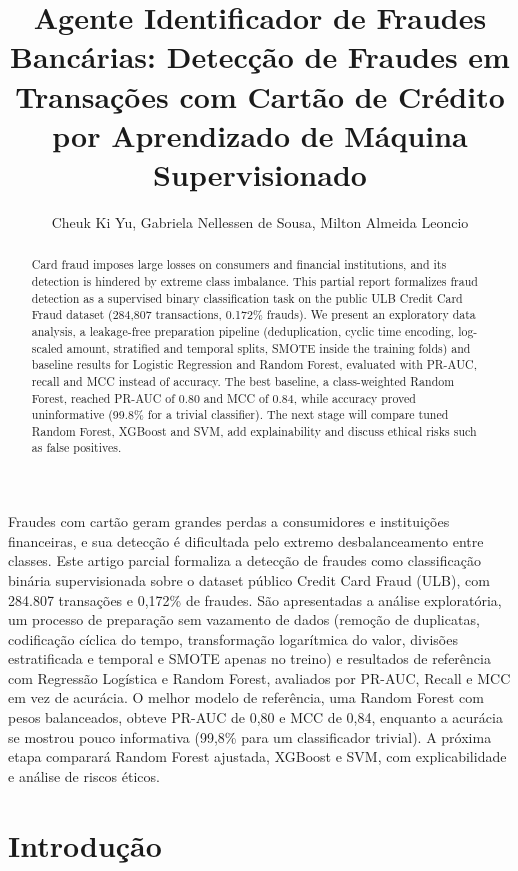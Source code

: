 \documentclass[12pt]{article}
\title{Agente Identificador de Fraudes Bancárias: Detecção de Fraudes em
Transações com Cartão de Crédito por Aprendizado de Máquina Supervisionado}
\author{Cheuk Ki Yu\inst{1}, Gabriela Nellessen de Sousa\inst{1}, Milton Almeida Leoncio\inst{1}}
\begin{document}
\maketitle

\begin{abstract}
Card fraud imposes large losses on consumers and financial institutions, and
its detection is hindered by extreme class imbalance. This partial report
formalizes fraud detection as a supervised binary classification task on the
public ULB Credit Card Fraud dataset (284,807 transactions, 0.172\% frauds).
We present an exploratory data analysis, a leakage-free preparation pipeline
(deduplication, cyclic time encoding, log-scaled amount, stratified and
temporal splits, SMOTE inside the training folds) and baseline results for
Logistic Regression and Random Forest, evaluated with PR-AUC, recall and MCC
instead of accuracy. The best baseline, a class-weighted Random Forest, reached PR-AUC of 0.80 and MCC of 0.84, while accuracy proved uninformative (99.8\% for a trivial classifier). The next
stage will compare tuned Random Forest, XGBoost and SVM, add explainability
and discuss ethical risks such as false positives.
\end{abstract}

\begin{resumo}
Fraudes com cartão geram grandes perdas a consumidores e instituições
financeiras, e sua detecção é dificultada pelo extremo desbalanceamento entre
classes. Este artigo parcial formaliza a detecção de fraudes como classificação
binária supervisionada sobre o dataset público Credit Card Fraud (ULB), com
284.807 transações e 0,172\% de fraudes. São apresentadas a análise
exploratória, um processo de preparação sem vazamento de dados (remoção de
duplicatas, codificação cíclica do tempo, transformação logarítmica do valor,
divisões estratificada e temporal e SMOTE apenas no treino) e resultados de
referência com Regressão Logística e Random Forest, avaliados por PR-AUC,
Recall e MCC em vez de acurácia. O melhor modelo de referência, uma Random Forest com pesos balanceados, obteve
PR-AUC de 0,80 e MCC de 0,84, enquanto a acurácia se mostrou pouco informativa (99,8\% para um classificador trivial). A próxima etapa comparará Random Forest ajustada, XGBoost e
SVM, com explicabilidade e análise de riscos éticos.
\end{resumo}

\section{Introdução}
\end{document}
